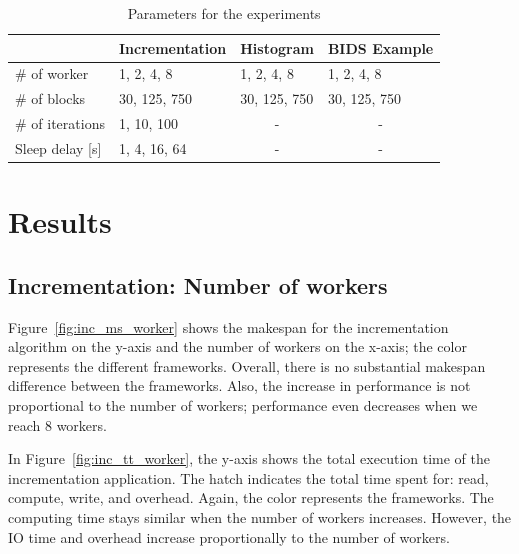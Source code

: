 \documentclass[conference]{IEEEtran}
\begin{document}
\begin{table}[!t]
    \renewcommand{\arraystretch}{1.3}
    \caption{Parameters for the experiments}\label{tab:param}
    \centering
    \begin{tabular*}{\columnwidth}{llll}
    \hline
                        & Incrementation & Histogram             & BIDS Example          \\ \hline
    \# of worker        & 1, 2, 4, 8     & 1, 2, 4, 8            & 1, 2, 4, 8            \\
    \# of blocks        & 30, 125, 750   & 30, 125, 750          & 30, 125, 750          \\
    \# of iterations    & 1, 10, 100     & \multicolumn{1}{c}{-} & \multicolumn{1}{c}{-} \\
    Sleep delay {[}s{]} & 1, 4, 16, 64   & \multicolumn{1}{c}{-} & \multicolumn{1}{c}{-} \\ \hline
    \end{tabular*}
    \end{table}






\section{Results}

\subsection{Incrementation: Number of workers}
Figure~\ref{fig:inc_ms_worker} shows the makespan for the incrementation algorithm on
the y-axis and the number of workers on the x-axis; the color represents the
different frameworks. Overall, there is no substantial makespan difference between
the frameworks. Also, the increase in performance is not proportional to the number
of workers; performance even decreases when we reach 8 workers.

In Figure~\ref{fig:inc_tt_worker}, the y-axis shows the total execution time of the
incrementation application. The hatch indicates the total time spent for: read,
compute, write, and overhead. Again, the color represents the frameworks. The
computing time stays similar when the number of workers increases. However, the IO
time and overhead increase proportionally to the number of workers.
\end{document}

